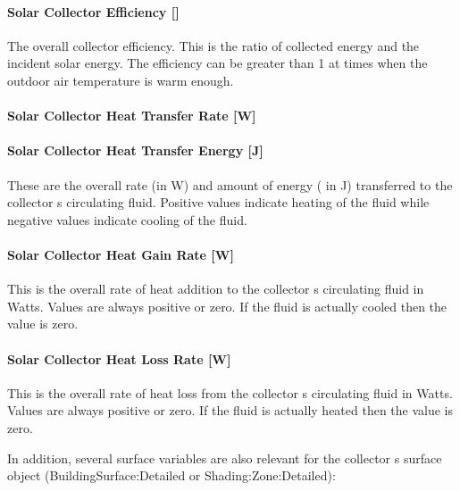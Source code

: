 \paragraph{Solar Collector Efficiency {[]}}\label{solar-collector-efficiency}

The overall collector efficiency. This is the ratio of collected energy and the incident solar energy. The efficiency can be greater than 1 at times when the outdoor air temperature is warm enough.

\paragraph{Solar Collector Heat Transfer Rate {[}W{]}}\label{solar-collector-heat-transfer-rate-w}

\paragraph{Solar Collector Heat Transfer Energy {[}J{]}}\label{solar-collector-heat-transfer-energy-j}

These are the overall rate (in W) and amount of energy ( in J) transferred to the collector s circulating fluid. Positive values indicate heating of the fluid while negative values indicate cooling of the fluid.

\paragraph{Solar Collector Heat Gain Rate {[}W{]}}\label{solar-collector-heat-gain-rate-w}

This is the overall rate of heat addition to the collector s circulating fluid in Watts. Values are always positive or zero. If the fluid is actually cooled then the value is zero.

\paragraph{Solar Collector Heat Loss Rate {[}W{]}}\label{solar-collector-heat-loss-rate-w}

This is the overall rate of heat loss from the collector s circulating fluid in Watts. Values are always positive or zero. If the fluid is actually heated then the value is zero.

In addition, several surface variables are also relevant for the collector s surface object (BuildingSurface:Detailed or Shading:Zone:Detailed):

